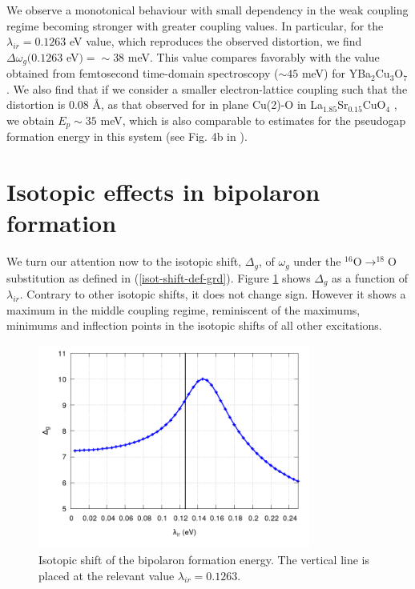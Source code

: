 We observe a monotonical behaviour with small dependency in the weak coupling regime becoming stronger with greater coupling values.
In particular, for the $\lambda_{ir}=0.1263$ eV value, which reproduces the observed distortion, we find $\Delta\omega_{g}(0.1263$ eV$) = \sim 38$ meV.
This value compares favorably with the value obtained from femtosecond time-domain spectroscopy ($\sim 45$ meV) for YBa$_2$Cu$_3$O$_7$ \cite{Demsar1999}. 
We also find that if we consider a smaller electron-lattice coupling such that the distortion is 0.08 \AA, as that observed for in plane Cu(2)-O in La$_{1.85}$Sr$_{0.15}$CuO$_4$ \cite{Bianconi1996}, we obtain $E_p \sim 35$ meV, which is also comparable to estimates for the pseudogap formation energy in this system (see Fig. 4b in \cite{Kusar2005}).

\section{Isotopic effects in bipolaron formation}
\label{sec:grd-isotopic}

We turn our attention now to the isotopic shift, $\Delta_g$, of $\omega_g$ under the $^{16}$O$\rightarrow ^{18}$O substitution as defined in (\ref{isot-shift-def-grd}).
Figure \ref{fig:isot_polaron_formation} shows $\Delta_g$ as a function of $\lambda_{ir}$.
Contrary to other isotopic shifts, it does not change sign.
However it shows a maximum in the middle coupling regime, reminiscent of the maximums, minimums and inflection points in the isotopic shifts of all other excitations.

\begin{figure}[ht!]
  \centering
  \includegraphics[width=0.8\textwidth]{images/isot-polaron-formation.png}
  \caption{Isotopic shift of the bipolaron formation energy. The vertical line is placed at the relevant value $\lambda_{ir}=0.1263$.}
  \label{fig:isot_polaron_formation}
\end{figure}